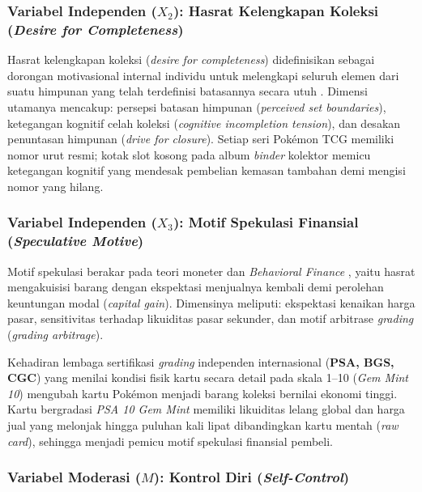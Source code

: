 \documentclass[12pt,a4paper]{article}
\numberwithin{equation}{section}
\numberwithin{table}{section}
\numberwithin{figure}{section}
\begin{document}
\subsubsection{Variabel Independen ($X_2$): Hasrat Kelengkapan Koleksi (\emph{Desire for Completeness})}

Hasrat kelengkapan koleksi (\emph{desire for completeness}) didefinisikan sebagai dorongan motivasional internal individu untuk melengkapi seluruh elemen dari suatu himpunan yang telah terdefinisi batasannya secara utuh \citep{belk1995collecting, gao2014completing, barasz2017pseudo}. Dimensi utamanya mencakup: persepsi batasan himpunan (\emph{perceived set boundaries}), ketegangan kognitif celah koleksi (\emph{cognitive incompletion tension}), dan desakan penuntasan himpunan (\emph{drive for closure}). Setiap seri Pok\'emon TCG memiliki nomor urut resmi; kotak slot kosong pada album \emph{binder} kolektor memicu ketegangan kognitif yang mendesak pembelian kemasan tambahan demi mengisi nomor yang hilang.

\subsubsection{Variabel Independen ($X_3$): Motif Spekulasi Finansial (\emph{Speculative Motive})}

Motif spekulasi berakar pada teori moneter \citet{keynes1936general} dan \emph{Behavioral Finance} \citep{shiller2000irrational, baur2018bitcoin}, yaitu hasrat mengakuisisi barang dengan ekspektasi menjualnya kembali demi perolehan keuntungan modal (\emph{capital gain}). Dimensinya meliputi: ekspektasi kenaikan harga pasar, sensitivitas terhadap likuiditas pasar sekunder, dan motif arbitrase \emph{grading} (\emph{grading arbitrage}).

Kehadiran lembaga sertifikasi \emph{grading} independen internasional (\textbf{PSA, BGS, CGC}) yang menilai kondisi fisik kartu secara detail pada skala 1--10 (\emph{Gem Mint 10}) mengubah kartu Pok\'emon menjadi barang koleksi bernilai ekonomi tinggi. Kartu bergradasi \emph{PSA 10 Gem Mint} memiliki likuiditas lelang global dan harga jual yang melonjak hingga puluhan kali lipat dibandingkan kartu mentah (\emph{raw card}), sehingga menjadi pemicu motif spekulasi finansial pembeli.

\subsubsection{Variabel Moderasi ($M$): Kontrol Diri (\emph{Self-Control})}
\end{document}
